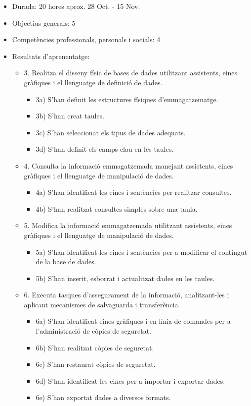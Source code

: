 \documentclass[catalan, a4paper, 12pt, titlepage]{article}
\begin{document}
  \begin{itemize}
	\item Durada: 20 hores aprox. 28 Oct. - 15 Nov.
	\item Objectius generals: 5
	\item Competències professionals, personals i socials: 4
	\item Resultats d'aprenentatge: 
		\begin{itemize}
			\item 3. Realitza el disseny físic de bases de dades utilitzant assistents, eines gràfiques i el llenguatge de definició de dades.
				\begin{itemize}
					\item 3a) S'han definit les estructures físiques d'emmagatzematge.
					\item 3b) S'han creat taules.
					\item 3c) S'han seleccionat els tipus de dades adequats.
					\item 3d) S'han definit els camps clau en les taules.
				\end{itemize}
			\item 4. Consulta la informació emmagatzemada manejant assistents, eines gràfiques i el llenguatge de manipulació de dades.
				\begin{itemize}
					\item 4a) S'han identificat les eines i sentències per realitzar consultes.
					\item 4b) S'han realitzat consultes simples sobre una taula.
				\end{itemize}
			\item 5. Modifica la informació emmagatzemada utilitzant assistents, eines gràfiques i el llenguatge de manipulació de dades.
				\begin{itemize}
					\item 5a) S'han identificat les eines i sentències per a modificar el contingut de la base de dades.
					\item 5b) S'han inserit, esborrat i actualitzat dades en les taules.
				\end{itemize}
			\item 6. Executa tasques d'assegurament de la informació, analitzant-les i aplicant mecanismes de salvaguarda i transferència.
				\begin{itemize}
					\item 6a) S'han identificat eines gràfiques i en línia de comandes per a l'administració de còpies de seguretat.
					\item 6b) S'han realitzat còpies de seguretat.
					\item 6c) S'han restaurat còpies de seguretat.
					\item 6d) S'han identificat les eines per a importar i exportar dades.
					\item 6e) S'han exportat dades a diversos formats.
				\end{itemize}
		\end{itemize}
  \end{itemize}
\end{document}
